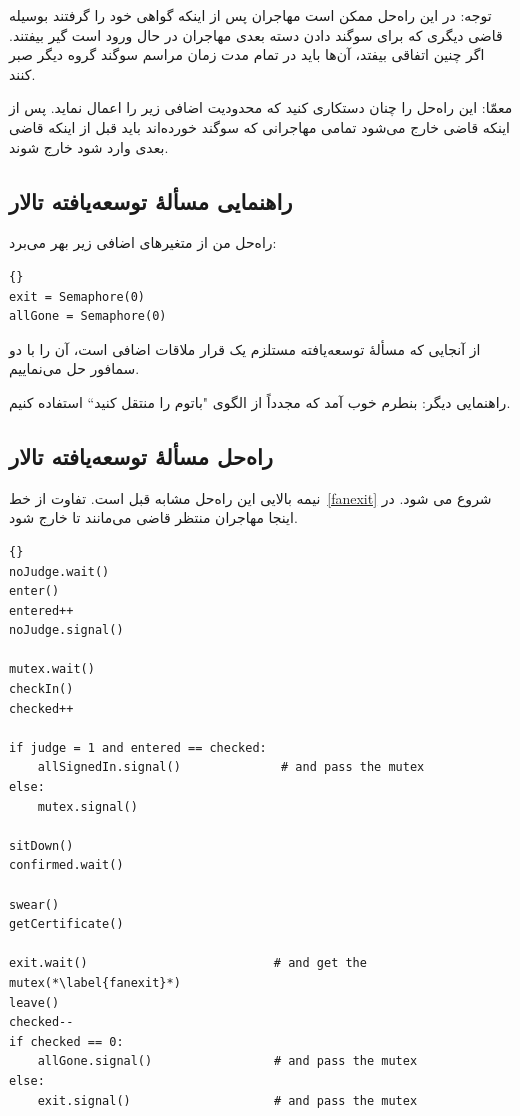 \documentclass{book}
\newcommand{\clearemptydoublepage}{\newpage\cleardoublepage}
\begin{document}
    توجه: در این راه‌حل ممکن است مهاجران پس از اینکه گواهی خود را گرفتند بوسیله قاضی‌ دیگری که برای سوگند دادن دسته بعدی 
    مهاجران در حال ورود است گیر بیفتند. اگر چنین اتفاقی بیفتد، آن‌ها باید در تمام مدت زمان مراسم سوگند گروه دیگر صبر کنند. 

    معمّا: این راه‌حل را چنان دستکاری کنید که محدودیت اضافی زیر را اعمال نماید. پس از اینکه قاضی خارج می‌شود تمامی مهاجرانی که سوگند خورده‌اند 
    باید قبل از اینکه قاضی بعدی وارد شود خارج شوند. 

   
\clearemptydoublepage
\subsection{راهنمایی مسألهٔ توسعه‌یافته تالار }

    راه‌حل من از متغیرهای اضافی زیر بهر می‌برد:‌

\begin{latin}
\begin{lstlisting}[title=\rl{راهنمایی مسألهٔ تالار \lr{Faneuil}}]{}
exit = Semaphore(0)
allGone = Semaphore(0)
\end{lstlisting}
\end{latin}

    از آنجایی که مسألهٔ توسعه‌یافته مستلزم یک قرار ملاقات اضافی است،‌ آن را با دو سمافور حل می‌نماییم. 

    راهنمایی دیگر: بنطرم خوب آمد که مجدداً از الگوی "باتوم را منتقل کنید`` استفاده کنیم. 


\clearemptydoublepage
\subsection{راه‌حل مسألهٔ توسعه‌یافته تالار }

    نیمه بالایی این راه‌حل مشابه قبل است. تفاوت از خط~\ref{fanexit} شروع می شود. در اینجا مهاجران منتظر قاضی می‌مانند تا خارج شود. 

\begin{latin}
\begin{lstlisting}[title=\rl{راهنمایی مسألهٔ تالار \lr{Faneuil} (مهاجر)}]{}
noJudge.wait()
enter()
entered++
noJudge.signal()

mutex.wait()
checkIn()
checked++

if judge = 1 and entered == checked:
    allSignedIn.signal()              # and pass the mutex
else:
    mutex.signal()

sitDown()
confirmed.wait()

swear()
getCertificate()

exit.wait()                          # and get the mutex(*\label{fanexit}*)
leave()
checked--
if checked == 0:
    allGone.signal()                 # and pass the mutex
else:
    exit.signal()                    # and pass the mutex
\end{lstlisting}
\end{latin}
\end{document}
